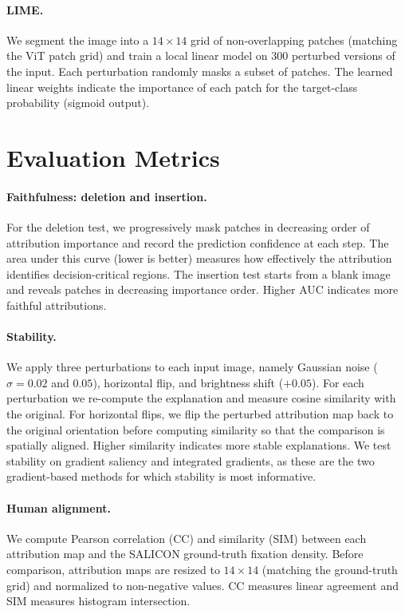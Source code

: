 \documentclass{article}
\begin{document}
\paragraph{LIME.}
We segment the image into a $14\!\times\!14$ grid of non-overlapping patches (matching the ViT patch grid) and train a local linear model on 300 perturbed versions of the input. Each perturbation randomly masks a subset of patches. The learned linear weights indicate the importance of each patch for the target-class probability (sigmoid output).

\section{Evaluation Metrics}

\paragraph{Faithfulness: deletion and insertion.}
For the deletion test, we progressively mask patches in decreasing order of attribution importance and record the prediction confidence at each step. The area under this curve (lower is better) measures how effectively the attribution identifies decision-critical regions. The insertion test starts from a blank image and reveals patches in decreasing importance order. Higher AUC indicates more faithful attributions.

\paragraph{Stability.}
We apply three perturbations to each input image, namely Gaussian noise ($\sigma = 0.02$ and $0.05$), horizontal flip, and brightness shift ($+0.05$). For each perturbation we re-compute the explanation and measure cosine similarity with the original. For horizontal flips, we flip the perturbed attribution map back to the original orientation before computing similarity so that the comparison is spatially aligned. Higher similarity indicates more stable explanations. We test stability on gradient saliency and integrated gradients, as these are the two gradient-based methods for which stability is most informative.

\paragraph{Human alignment.}
We compute Pearson correlation (CC) and similarity (SIM) between each attribution map and the SALICON ground-truth fixation density. Before comparison, attribution maps are resized to $14\!\times\!14$ (matching the ground-truth grid) and normalized to non-negative values. CC measures linear agreement and SIM measures histogram intersection.
\end{document}
